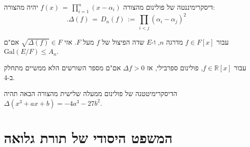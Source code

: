 \documentclass{tstextbook}
\begin{document}
\begin{definition}[דיסקרימיננטה]
דיסקרימיננטה של פולינום מהצורה \(f(x)\,=\,\prod_{i=1}^{n}(x-\alpha_{i})\) יהיה מהצורה:
$$.\Delta(f)\,=\,D_{n}(f)\,:=\,\prod_{i<j}(\alpha_{i}-\alpha_{j})^{2}$$

\end{definition}
\begin{proposition}
עבור \(f \in F[x]\) מדרגה \(n\), ו-\(E\) שדה הפיצול של \(f\) מעל \(F\). אזי \(\sqrt{ \Delta(f) } \in F\) אם"ם \(\mathrm{Gal}(E / F)\leq A_{n}\).

\end{proposition}
\begin{proposition}
עבור \(f \in \mathbb{R}[x]\), פולינום ספרבילי, אז \(\Delta f>0\) אם"ם מספר השורשים הלא ממשיים מתחלק ב-4.

\end{proposition}
\begin{proposition}
הדיסקרימיטטנה של פולינום ממעלה שלישית מהצורה הבאה תהיה \(\Delta\left(x^{3}+a x+b\right)=-4a^{3}-27b^{2}\).

\end{proposition}

\section{המשפט היסודי של תורת גלואה}
\end{document}
